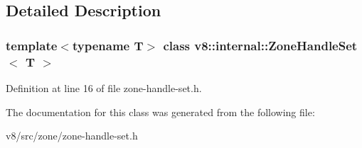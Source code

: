 \subsection{Detailed Description}
\subsubsection*{template$<$typename T$>$\newline
class v8\+::internal\+::\+Zone\+Handle\+Set$<$ T $>$}



Definition at line 16 of file zone-\/handle-\/set.\+h.



The documentation for this class was generated from the following file\+:\begin{DoxyCompactItemize}
\item 
v8/src/zone/zone-\/handle-\/set.\+h\end{DoxyCompactItemize}
